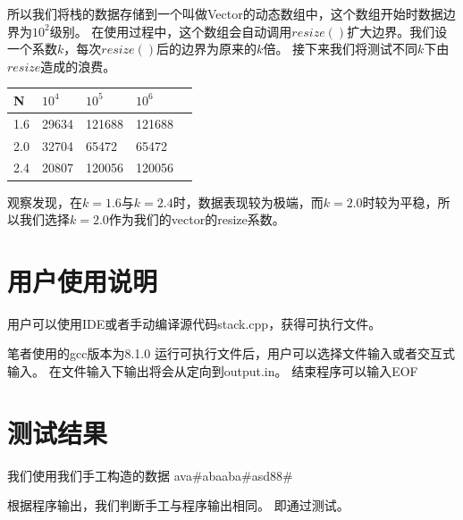   所以我们将栈的数据存储到一个叫做Vector的动态数组中，这个数组开始时数据边界为$10^2$级别。
   在使用过程中，这个数组会自动调用$resize()$扩大边界。我们设一个系数$k$，每次$resize()$后的边界为原来的$k$倍。
   接下来我们将测试不同$k$下由$resize$造成的浪费。



\begin{longtable}[c]{@{}lllll@{}}
   \toprule
   N   & $10^4$ & $10^5$ & $10^6$ &  \\* \midrule
   \endfirsthead
   \endhead
   \bottomrule
   \endfoot
   \endlastfoot
   1.6 & 29634  & 121688 & 121688 &  \\
   2.0 & 32704  & 65472  & 65472  &  \\
   2.4 & 20807  & 120056 & 120056 &  \\* \bottomrule
   \end{longtable}


   观察发现，在$k=1.6$与$k=2.4$时，数据表现较为极端，而$k=2.0$时较为平稳，所以我们选择$k=2.0$作为我们的vector的resize系数。


\newpage

\section{用户使用说明}
   用户可以使用IDE或者手动编译源代码stack.cpp，获得可执行文件。

   笔者使用的gcc版本为8.1.0
   运行可执行文件后，用户可以选择文件输入或者交互式输入。
   在文件输入下输出将会从定向到output.in。
   结束程序可以输入EOF

\section{测试结果}

   我们使用我们手工构造的数据
   ava\#abaaba\#asd88\#

   根据程序输出，我们判断手工与程序输出相同。
   即通过测试。



